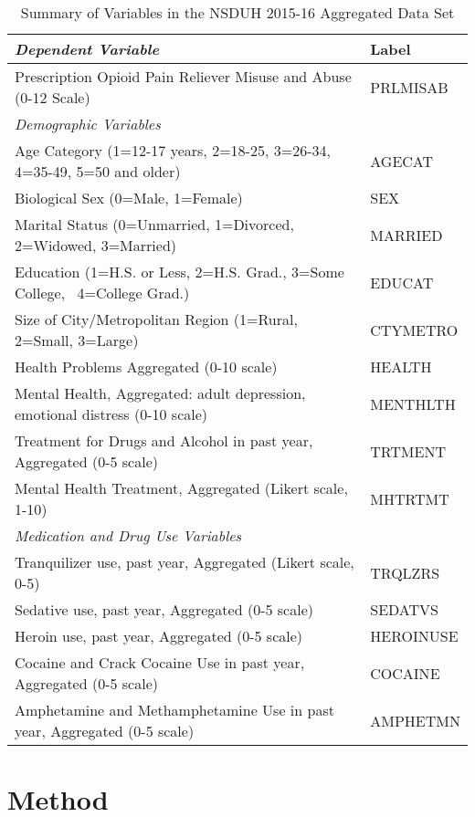 \documentclass[sigconf]{acmart}
\begin{document}
\begin{table*}[ht]
  \caption{Summary of Variables in the NSDUH 2015-16 Aggregated Data Set}
  \label{tab:freq}
  \begin{tabular}{ll}
    \toprule
    \textit{Dependent Variable} & Label \\
    \midrule
    Prescription Opioid Pain Reliever Misuse and Abuse (0-12 Scale)& PRLMISAB  \\
    \midrule
    \textit{Demographic Variables}&   \\
    \midrule
    Age Category (1=12-17 years, 2=18-25, 3=26-34, 4=35-49, 5=50 and older)& AGECAT \\
    Biological Sex (0=Male, 1=Female)& SEX  \\
    Marital Status (0=Unmarried, 1=Divorced, 2=Widowed, 3=Married)& MARRIED  \\
    Education (1=H.S. or Less, 2=H.S. Grad., 3=Some College,  4=College Grad.)& EDUCAT  \\
    Size of City/Metropolitan Region (1=Rural, 2=Small, 3=Large)& CTYMETRO  \\
    Health Problems Aggregated  (0-10 scale)& HEALTH  \\
    Mental Health, Aggregated: adult depression, emotional distress (0-10 scale)& MENTHLTH  \\
    Treatment for Drugs and Alcohol in past year, Aggregated (0-5 scale)& TRTMENT  \\
    Mental Health Treatment, Aggregated (Likert scale, 1-10)& MHTRTMT  \\
    \midrule
    \textit{Medication and Drug Use Variables}& \\
    \midrule
    Tranquilizer use, past year, Aggregated (Likert scale, 0-5)& TRQLZRS \\
    Sedative use, past year, Aggregated (0-5 scale)& SEDATVS  \\
    Heroin use, past year, Aggregated (0-5 scale)& HEROINUSE  \\
    Cocaine and Crack Cocaine Use in past year, Aggregated  (0-5 scale)& COCAINE  \\
    Amphetamine and Methamphetamine Use in past year, Aggregated (0-5 scale)& AMPHETMN  \\
    \bottomrule
  \end{tabular}
\end{table*}

\section{Method}
\end{document}
